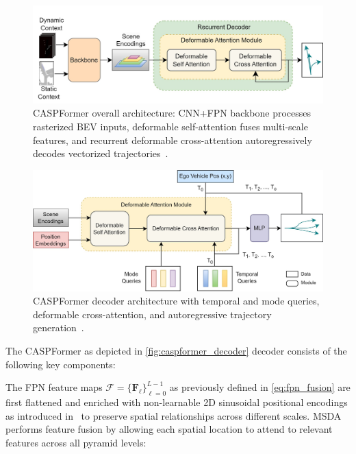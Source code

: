 \begin{description}[leftmargin=1em,itemsep=2pt]
\begin{figure}[ht]
  \centering
  \includegraphics[width=\linewidth]{figures/caspformer-overall-arch.jpg}
  \caption{CASPFormer overall architecture: CNN+FPN backbone processes rasterized BEV inputs, deformable self-attention fuses multi-scale features, and recurrent deformable cross-attention autoregressively decodes vectorized trajectories~\cite{caspformerYadav2024}.}
  \label{fig:caspformer_overall}
\end{figure}

\begin{figure}[ht]
  \centering
  \includegraphics[width=0.85\linewidth]{figures/caspformer_decoder.jpg}
  \caption{CASPFormer decoder architecture with temporal and mode queries, deformable cross-attention, and autoregressive trajectory generation~\cite{caspformerYadav2024}.}
  \label{fig:caspformer_decoder}
\end{figure}

The CASPFormer as depicted in \autoref{fig:caspformer_decoder} decoder consists of the following key components:

\begin{description}[leftmargin=1em,itemsep=2pt]
\item[Multi-Scale Deformable Self-Attention (MSDA).] The FPN feature maps \(\boldsymbol{\mathcal{F}} = \{\mathbf{F}_\ell\}_{\ell=0}^{L-1}\) as previously defined in \autoref{eq:fpn_fusion} are first flattened and enriched with non-learnable 2D sinusoidal positional encodings as introduced in~\cite{vaswani2023attention} to preserve spatial relationships across different scales. MSDA performs feature fusion by allowing each spatial location to attend to relevant features across all pyramid levels:


\end{description}
\end{description}
